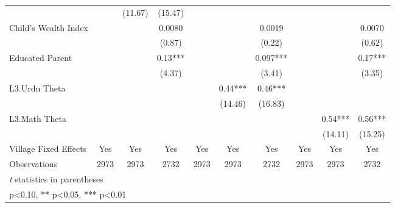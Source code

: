 \begin{sidewaystable}[htbp]
\begin{tabular}{l*{9}{c}}
                &            &  (11.67)   &  (15.47)   &            &            &            &            &            &            \\
Child's Wealth Index&            &            &   0.0080   &            &            &   0.0019   &            &            &   0.0070   \\
                &            &            &   (0.87)   &            &            &   (0.22)   &            &            &   (0.62)   \\
Educated Parent &            &            &     0.13***&            &            &    0.097***&            &            &     0.17***\\
                &            &            &   (4.37)   &            &            &   (3.41)   &            &            &   (3.35)   \\
L3.Urdu Theta   &            &            &            &            &     0.44***&     0.46***&            &            &            \\
                &            &            &            &            &  (14.46)   &  (16.83)   &            &            &            \\
L3.Math Theta   &            &            &            &            &            &            &            &     0.54***&     0.56***\\
                &            &            &            &            &            &            &            &  (14.11)   &  (15.25)   \\
Village Fixed Effects&      Yes   &      Yes   &      Yes   &      Yes   &      Yes   &      Yes   &      Yes   &      Yes   &      Yes   \\
\midrule
Observations    &     2973   &     2973   &     2732   &     2973   &     2973   &     2732   &     2973   &     2973   &     2732   \\
\bottomrule
\multicolumn{10}{l}{\footnotesize \textit{t} statistics in parentheses}\\
\multicolumn{10}{l}{\footnotesize * p<0.10, ** p<0.05, *** p<0.01}\\
\end{tabular}
\end{sidewaystable}

